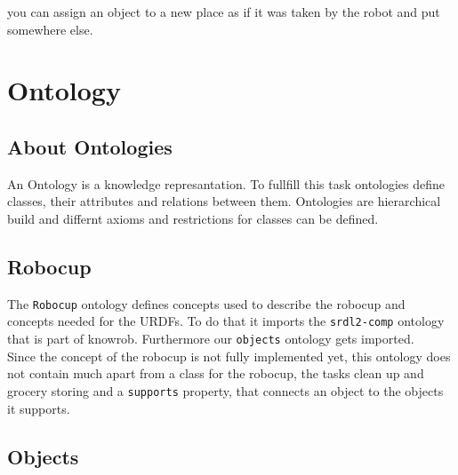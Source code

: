 \documentclass[main.tex]{subfiles}
\begin{document}
you can assign an object to a new place as if it was taken by the robot and put somewhere else.

\section{Ontology}
\subsection{About Ontologies}
An Ontology is a knowledge represantation. To fullfill this task ontologies define classes, their attributes and relations between them. Ontologies are hierarchical build and differnt axioms and restrictions for classes can be defined.


\subsection{Robocup}
The \texttt{Robocup} ontology defines concepts used to describe the robocup and concepts needed for the URDFs. To do that it imports the \texttt{srdl2-comp} ontology that is part of knowrob. Furthermore our \texttt{objects} ontology gets imported.\\
Since the concept of the robocup is not fully implemented yet, this ontology does not contain much apart from a class for the robocup, the tasks clean up and grocery storing and a \texttt{supports} property, that connects an object to the objects it supports.

\subsection{Objects}
\end{document}
